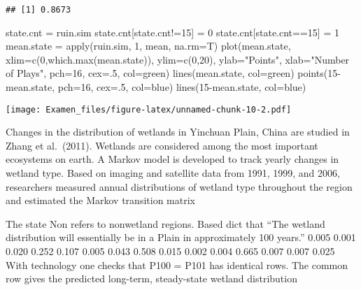 \documentclass[
]{article}
\newenvironment{Shaded}{\begin{snugshade}}{\end{snugshade}}
\newcommand{\AttributeTok}[1]{\textcolor[rgb]{0.77,0.63,0.00}{#1}}
\newcommand{\DecValTok}[1]{\textcolor[rgb]{0.00,0.00,0.81}{#1}}
\newcommand{\FunctionTok}[1]{\textcolor[rgb]{0.00,0.00,0.00}{#1}}
\newcommand{\NormalTok}[1]{#1}
\newcommand{\OtherTok}[1]{\textcolor[rgb]{0.56,0.35,0.01}{#1}}
\newcommand{\SpecialCharTok}[1]{\textcolor[rgb]{0.00,0.00,0.00}{#1}}
\newcommand{\StringTok}[1]{\textcolor[rgb]{0.31,0.60,0.02}{#1}}
\begin{document}
\begin{verbatim}
## [1] 0.8673
\end{verbatim}

\begin{Shaded}
\begin{Highlighting}[]
\NormalTok{state.cnt }\OtherTok{=}\NormalTok{ ruin.sim}
\NormalTok{state.cnt[state.cnt}\SpecialCharTok{!=}\DecValTok{15}\NormalTok{] }\OtherTok{=} \DecValTok{0}
\NormalTok{state.cnt[state.cnt}\SpecialCharTok{==}\DecValTok{15}\NormalTok{] }\OtherTok{=} \DecValTok{1}
\NormalTok{mean.state }\OtherTok{=} \FunctionTok{apply}\NormalTok{(ruin.sim, }\DecValTok{1}\NormalTok{, mean, }\AttributeTok{na.rm=}\NormalTok{T)}
\FunctionTok{plot}\NormalTok{(mean.state, }\AttributeTok{xlim=}\FunctionTok{c}\NormalTok{(}\DecValTok{0}\NormalTok{,}\FunctionTok{which.max}\NormalTok{(mean.state)), }\AttributeTok{ylim=}\FunctionTok{c}\NormalTok{(}\DecValTok{0}\NormalTok{,}\DecValTok{20}\NormalTok{), }\AttributeTok{ylab=}\StringTok{"Points"}\NormalTok{, }\AttributeTok{xlab=}\StringTok{"Number of Plays"}\NormalTok{, }\AttributeTok{pch=}\DecValTok{16}\NormalTok{, }\AttributeTok{cex=}\NormalTok{.}\DecValTok{5}\NormalTok{, }\AttributeTok{col=}\StringTok{\textquotesingle{}green\textquotesingle{}}\NormalTok{)}
\FunctionTok{lines}\NormalTok{(mean.state, }\AttributeTok{col=}\StringTok{\textquotesingle{}green\textquotesingle{}}\NormalTok{)}
\FunctionTok{points}\NormalTok{(}\DecValTok{15}\SpecialCharTok{{-}}\NormalTok{mean.state, }\AttributeTok{pch=}\DecValTok{16}\NormalTok{, }\AttributeTok{cex=}\NormalTok{.}\DecValTok{5}\NormalTok{, }\AttributeTok{col=}\StringTok{\textquotesingle{}blue\textquotesingle{}}\NormalTok{)}
\FunctionTok{lines}\NormalTok{(}\DecValTok{15}\SpecialCharTok{{-}}\NormalTok{mean.state, }\AttributeTok{col=}\StringTok{\textquotesingle{}blue\textquotesingle{}}\NormalTok{)}
\end{Highlighting}
\end{Shaded}

\texttt{[image: Examen\_files/figure-latex/unnamed-chunk-10-2.pdf]}

Changes in the distribution of wetlands in Yinchuan Plain, China are
studied in Zhang et al.~(2011). Wetlands are considered among the most
important ecosystems on earth. A Markov model is developed to track
yearly changes in wetland type. Based on imaging and satellite data from
1991, 1999, and 2006, researchers measured annual distributions of
wetland type throughout the region and estimated the Markov transition
matrix

The state Non refers to nonwetland regions. Based dict that ``The
wetland distribution will essentially be in a Plain in approximately 100
years.'' 0.005 0.001 0.020 0.252 0.107 0.005 0.043 0.508 0.015 0.002
0.004 0.665 0.007 0.007 0.025 With technology one checks that P100 =
P101 has identical rows. The common row gives the predicted long-term,
steady-state wetland distribution
\end{document}
